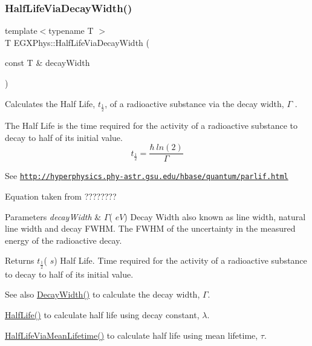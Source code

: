 \subsubsection{\texorpdfstring{Half\+Life\+Via\+Decay\+Width()}{HalfLifeViaDecayWidth()}}
{\footnotesize\ttfamily template$<$typename T $>$ \\
T E\+G\+X\+Phys\+::\+Half\+Life\+Via\+Decay\+Width (\begin{DoxyParamCaption}\item[{const T \&}]{decay\+Width }\end{DoxyParamCaption})}



Calculates the Half Life, $t_{\frac{1}{2}}$, of a radioactive substance via the decay width, $\Gamma$ . 

The Half Life is the time required for the activity of a radioactive substance to decay to half of its initial value. \[t_{\frac{1}{2}}=\frac{\hbar \ ln(2)}{\Gamma}\]

See \href{http://hyperphysics.phy-astr.gsu.edu/hbase/quantum/parlif.html}{\tt http\+://hyperphysics.\+phy-\/astr.\+gsu.\+edu/hbase/quantum/parlif.\+html}

Equation taken from ????????


\begin{DoxyParams}{Parameters}
{\em decay\+Width} & $\Gamma$( $eV$) Decay Width also known as line width, natural line width and decay F\+W\+HM. The F\+W\+HM of the uncertainty in the measured energy of the radioactive decay. \\
\hline
\end{DoxyParams}
\begin{DoxyReturn}{Returns}
$t_{\frac{1}{2}}$( $s$) Half Life. Time required for the activity of a radioactive substance to decay to half of its initial value. 
\end{DoxyReturn}
\begin{DoxySeeAlso}{See also}
\hyperlink{group___decay_width_gae232ec8bb39710131be898c057a25620}{Decay\+Width()} to calculate the decay width, $\Gamma$. 

\hyperlink{group___half_life_ga21d268f154fb91c1c556bbfa7fe83ac1}{Half\+Life()} to calculate half life using decay constant, $\lambda$. 

\hyperlink{group___half_life_gacddef16b62e98b214ec8dd8af7da7dce}{Half\+Life\+Via\+Mean\+Lifetime()} to calculate half life using mean lifetime, $\tau$. 
\end{DoxySeeAlso}
\mbox{\label{group___half_life_gacddef16b62e98b214ec8dd8af7da7dce}} 

